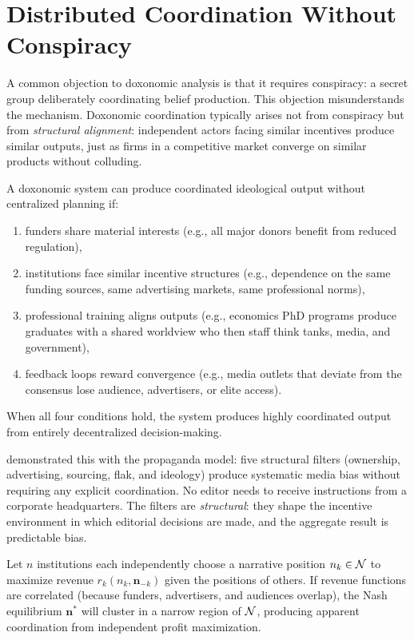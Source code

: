 \section{Distributed Coordination Without Conspiracy}
\label{sec:ch9-distributed}

A common objection to doxonomic analysis is that it requires conspiracy: a secret group deliberately coordinating belief production.
This objection misunderstands the mechanism.
Doxonomic coordination typically arises not from conspiracy but from \emph{structural alignment}: independent actors facing similar incentives produce similar outputs, just as firms in a competitive market converge on similar products without colluding.

\begin{principle}
\label{prin:structural-alignment}
A doxonomic system can produce coordinated ideological output without centralized planning if:
\begin{enumerate}[nosep]
  \item funders share material interests (e.g., all major donors benefit from reduced regulation),
  \item institutions face similar incentive structures (e.g., dependence on the same funding sources, same advertising markets, same professional norms),
  \item professional training aligns outputs (e.g., economics PhD programs produce graduates with a shared worldview who then staff think tanks, media, and government),
  \item feedback loops reward convergence (e.g., media outlets that deviate from the consensus lose audience, advertisers, or elite access).
\end{enumerate}
When all four conditions hold, the system produces highly coordinated output from entirely decentralized decision-making.
\end{principle}

\textcite{herman1988} demonstrated this with the propaganda model: five structural filters (ownership, advertising, sourcing, flak, and ideology) produce systematic media bias without requiring any explicit coordination.
No editor needs to receive instructions from a corporate headquarters.
The filters are \emph{structural}: they shape the incentive environment in which editorial decisions are made, and the aggregate result is predictable bias.

\begin{model}
\label{mod:emergent}
Let $n$ institutions each independently choose a narrative position $n_k \in \mathcal{N}$ to maximize revenue $r_k(n_k, \bm{n}_{-k})$ given the positions of others.
If revenue functions are correlated (because funders, advertisers, and audiences overlap), the Nash equilibrium $\bm{n}^*$ will cluster in a narrow region of $\mathcal{N}$, producing apparent coordination from independent profit maximization.
\end{model}

